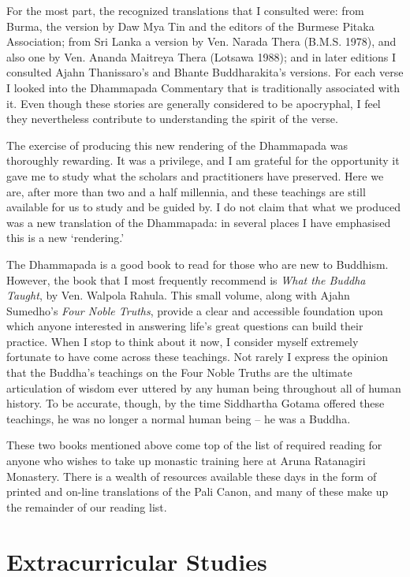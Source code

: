 For the most part, the recognized translations that I consulted were:
from Burma, the version by Daw Mya Tin and the editors of the
Burmese Pitaka Association\cite{burmese-pitaka}; from Sri Lanka a
version by Ven. Narada Thera (B.M.S. 1978), and also one by Ven. Ananda
Maitreya Thera (Lotsawa 1988); and in later editions I consulted
Ajahn Thanissaro's and Bhante Buddharakita's\cite{buddharakita} versions.
For each verse I looked into the Dhammapada Commentary\cite{commentary}
that is traditionally associated with it. Even
though these stories are generally considered to be apocryphal, I feel
they nevertheless contribute to understanding the spirit of the verse.

The exercise of producing this new rendering of the Dhammapada was
thoroughly rewarding. It was a privilege, and I am grateful for the
opportunity it gave me to study what the scholars and practitioners have
preserved. Here we are, after more than two and a half millennia, and
these teachings are still available for us to study and be guided by. I
do not claim that what we produced was a new translation of the
Dhammapada: in several places I have emphasised this is a new
`rendering.'

The Dhammapada is a good book to read for those who are new to Buddhism.
However, the book that I most frequently recommend is \emph{What the
  Buddha Taught}, by Ven. Walpola Rahula. This small volume,
along with Ajahn Sumedho's \emph{Four Noble Truths}\cite{truths}, provide a clear and accessible foundation
upon which anyone interested in answering life's great questions can
build their practice. When I stop to think about it now, I consider
myself extremely fortunate to have come across these teachings. Not
rarely I express the opinion that the Buddha's teachings on the Four
Noble Truths are the ultimate articulation of wisdom ever uttered by any
human being throughout all of human history. To be accurate, though, by
the time Siddhartha Gotama offered these teachings, he was no longer a
normal human being -- he was a Buddha.

These two books mentioned above come top of the list of required reading
for anyone who wishes to take up monastic training here at Aruna
Ratanagiri Monastery. There is a wealth of resources available these
days in the form of printed and on-line translations of the Pali Canon,
and many of these make up the remainder of our reading list.

\section{Extracurricular Studies}


